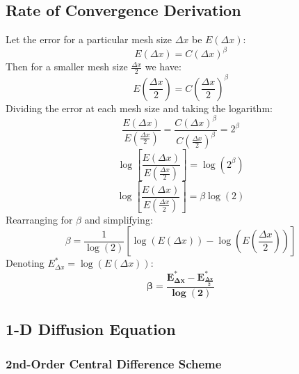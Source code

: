 \documentclass[10pt]{article}		%
\numberwithin{equation}{section}
\begin{document}
\subsection{Rate of Convergence Derivation}

Let the error for a particular mesh size $\Delta x$ be $E\left(\Delta x\right)$:
\begin{equation}
E\left(\Delta x\right) = C\left(\Delta x\right)^\beta
\end{equation}
Then for a smaller mesh size $\frac{\Delta x}{2}$ we have:
\begin{equation}
E\left(\frac{\Delta x}{2}\right) = C\left(\frac{\Delta x}{2}\right)^\beta
\end{equation}
Dividing the error at each mesh size and taking the logarithm:
\begin{equation}
\frac{E\left(\Delta x\right)}{E\left(\frac{\Delta x}{2}\right)} = \frac{C\left(\Delta x\right)^\beta}{C\left(\frac{\Delta x}{2}\right)^\beta} = 2^\beta
\end{equation}
\begin{equation}
\log\left[\frac{E\left(\Delta x\right)}{E\left(\frac{\Delta x}{2}\right)}\right] = \log(2^\beta)
\end{equation}
\begin{equation}
\log\left[\frac{E\left(\Delta x\right)}{E\left(\frac{\Delta x}{2}\right)}\right] = \beta \log(2)
\end{equation}
Rearranging for $\beta$ and simplifying:
\begin{equation}
\beta = \frac{1}{\log(2)} \left[\log\left(E\left(\Delta x\right)\right) - \log\left(E\left(\frac{\Delta x}{2}\right)\right)\right] 
\end{equation}
Denoting $E^*_{\Delta x} = \log\left(E\left(\Delta x\right)\right)$:
\begin{equation}
\mathbf{\beta = \frac{E^*_{\Delta x} - E^*_{\frac{\Delta x}{2}}}{\log (2)}}
\end{equation}

\newpage

\subsection{1-D Diffusion Equation}

\subsubsection{2nd-Order Central Difference Scheme}
\end{document}
